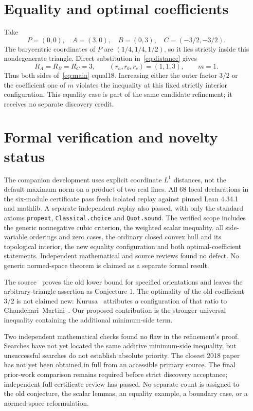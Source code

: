 \documentclass[11pt]{article}
\begin{document}
\section{Equality and optimal coefficients}
Take
\[
 P=(0,0),\quad A=(3,0),\quad B=(0,3),\quad C=(-3/2,-3/2).
\]
The barycentric coordinates of $P$ are $(1/4,1/4,1/2)$, so it lies strictly inside this nondegenerate triangle. Direct substitution in~\eqref{eq:distance} gives
\[
 R_A=R_B=R_C=3,\qquad(r_a,r_b,r_c)=(1,1,3),\qquad m=1.
\]
Thus both sides of~\eqref{eq:main} equal18. Increasing either the outer factor $3/2$ or the coefficient one of $m$ violates the inequality at this fixed strictly interior configuration. This equality case is part of the same candidate refinement; it receives no separate discovery credit.

\section{Formal verification and novelty status}
The companion development uses explicit coordinate $L^1$ distances, not the default maximum norm on a product of two real lines. All 68 local declarations in the six-module certificate pass fresh isolated replay against pinned Lean 4.34.1 and mathlib. A separate independent replay also passed, with only the standard axioms \texttt{propext}, \texttt{Classical.choice} and \texttt{Quot.sound}. The verified scope includes the generic nonnegative cubic criterion, the weighted scalar inequality, all side-variable orderings and zero cases, the ordinary closed convex hull and its topological interior, the new equality configuration and both optimal-coefficient statements. Independent mathematical and source reviews found no defect. No generic normed-space theorem is claimed as a separate formal result.

The source~\cite{pmb} proves the old lower bound for specified orientations and leaves the arbitrary-triangle assertion as Conjecture 1. The optimality of the old coefficient $3/2$ is not claimed new: Kurusa~\cite[Section 7.3.4]{kurusa} attributes a configuration of that ratio to Ghandehari--Martini~\cite[Figure 3]{gm}. Our proposed contribution is the stronger universal inequality containing the additional minimum-side term.

Two independent mathematical checks found no flaw in the refinement's proof. Searches have not yet located the same additive minimum-side inequality, but unsuccessful searches do not establish absolute priority. The closest 2018 paper has not yet been obtained in full from an accessible primary source. The final prior-work comparison remains required before strict discovery acceptance; independent full-certificate review has passed. No separate count is assigned to the old conjecture, the scalar lemmas, an equality example, a boundary case, or a normed-space reformulation.
\end{document}

